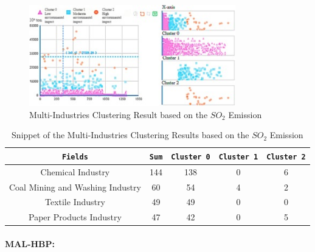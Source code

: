 \begin{figure}
    \centering
    \includegraphics[width=0.8\textwidth]{figures/liu_assessmentOfIndustries/liu_environmentalPerformance.jpg}
    \caption{Multi-Industries Clustering Result based on the $SO_2$ Emission \cite{LIU-BDE}}
    \label{fig:multi_industries_clustering_result_environemental_performance}
\end{figure}

\begin{table}[h]
    \centering
    \begin{tabular}{c|c|c|c|c}
        \texttt{Fields} & \texttt{Sum} & \texttt{Cluster 0} & \texttt{Cluster 1} & \texttt{Cluster 2} \\
        \hline
        Chemical Industry & 144 & 138 & 0 & 6 \\
        Coal Mining and Washing Industry & 60 & 54 & 4 & 2 \\
        Textile Industry & 49 & 49 & 0 & 0 \\
        Paper Products Industry & 47 & 42 & 0 & 5 \\
    \end{tabular}
    \caption{Snippet of the Multi-Industries Clustering Results based on the $SO_2$ Emission \cite{LIU-BDE}}
    \label{tab:multi_industries_clustering_results_based_on_the_so2_emission}
\end{table}

\paragraph*{MAL-HBP:}


